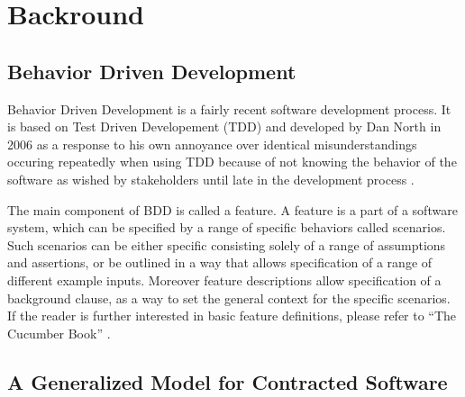 \section{Backround}

\subsection{Behavior Driven Development}
\label{sub:bdd}
Behavior Driven Development is a fairly recent software development process. It is based on Test Driven Developement (TDD) and developed by Dan North in 2006 as a response to his own annoyance over identical misunderstandings occuring repeatedly when using TDD because of not knowing the behavior of the software as wished by stakeholders until late in the development process \cite{north2006}. 

The main component of BDD is called a feature. 
A feature is a part of a software system,
which can be specified by a range of specific behaviors called scenarios.
Such scenarios can be either specific consisting solely of a range of
assumptions and assertions, or be outlined in a way that allows
specification of a range of different example inputs.
Moreover feature descriptions allow specification of a background clause,
as a way to set the general context for the specific scenarios.
If the reader is further interested in basic feature definitions,
please refer to “The Cucumber Book” \cite{hellesoy2012}.

\subsection{A Generalized Model for Contracted Software}
\label{sub:AGeneralizedModelforContractedSoftware}


